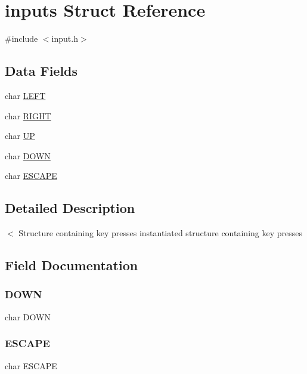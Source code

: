 \hypertarget{structinputs}{}\section{inputs Struct Reference}
\label{structinputs}


{\ttfamily \#include $<$input.\+h$>$}

\subsection*{Data Fields}
\begin{DoxyCompactItemize}
\item 
char \mbox{\hyperlink{structinputs_abf3a99e39f90b8c0b0adb499e8be44cb}{L\+E\+FT}}
\item 
char \mbox{\hyperlink{structinputs_ab56909fbd462ae4fa285e24388efcf9a}{R\+I\+G\+HT}}
\item 
char \mbox{\hyperlink{structinputs_acf487aade419fe84132d0b08da4636b8}{UP}}
\item 
char \mbox{\hyperlink{structinputs_aefd805006968caf870982fabe4a6494d}{D\+O\+WN}}
\item 
char \mbox{\hyperlink{structinputs_a15675417ba5a32ad2202c86452a52010}{E\+S\+C\+A\+PE}}
\end{DoxyCompactItemize}


\subsection{Detailed Description}
$<$ Structure containing key presses instantiated structure containing key presses 

\subsection{Field Documentation}
\mbox{\label{structinputs_aefd805006968caf870982fabe4a6494d}} 
\subsubsection{\texorpdfstring{DOWN}{DOWN}}
{\footnotesize\ttfamily char D\+O\+WN}

\mbox{\label{structinputs_a15675417ba5a32ad2202c86452a52010}} 
\subsubsection{\texorpdfstring{ESCAPE}{ESCAPE}}
{\footnotesize\ttfamily char E\+S\+C\+A\+PE}

